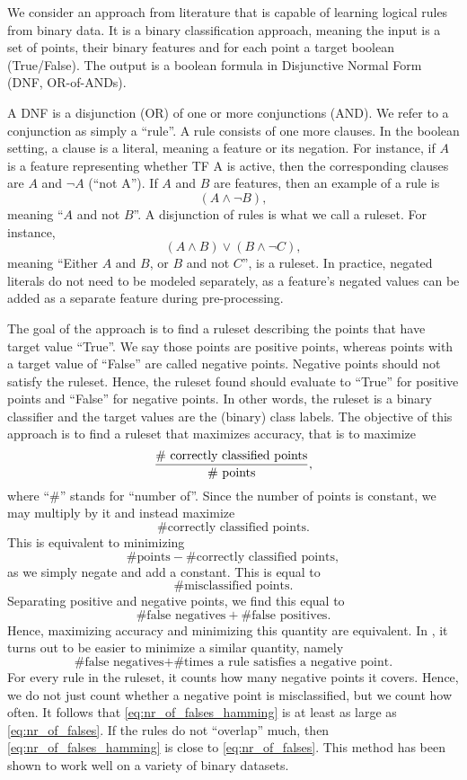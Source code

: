We consider an approach from literature that is capable of learning logical rules from binary data.
It is a binary classification approach, meaning the input is a set of points,
their binary features and for each point a target boolean (True/False).
The output is a boolean formula in Disjunctive Normal Form (DNF, OR-of-ANDs).

A DNF is a disjunction (OR) of one or more conjunctions (AND).
We refer to a conjunction as simply a ``rule''.
A rule consists of one more clauses.
In the boolean setting, a clause is a literal, meaning a feature or its negation.
For instance, if $A$ is a feature representing whether TF A is active,
then the corresponding clauses are $A$ and $\neg A$ (``not A'').
If $A$ and $B$ are features, then an example of a rule is
\[(A \wedge \neg B),\]
meaning ``$A$ and not $B$''.
A disjunction of rules is what we call a ruleset.
For instance,
\[(A \wedge B) \vee (B \wedge \neg C),\]
meaning ``Either $A$ and $B$, or $B$ and not $C$'',
is a ruleset.
In practice, negated literals do not need to be modeled separately,
as a feature's negated values can be added as a separate feature during pre-processing.

The goal of the approach is to find a ruleset describing the points that have target value ``True''.
We say those points are positive points, whereas points with a target value of ``False'' are called negative points.
Negative points should not satisfy the ruleset.
Hence, the ruleset found should evaluate to ``True'' for positive points and ``False'' for negative points.
In other words, the ruleset is a binary classifier and the target values are the (binary) class labels.
The objective of this approach is to find a ruleset that maximizes accuracy, that is to maximize
\[\frac{\text{\# correctly classified points}}{\text{\text{\# points}}},\]
where ``\#'' stands for ``number of''.
Since the number of points is constant, we may multiply by it and instead maximize
\[\text{\# correctly classified points}.\]
This is equivalent to minimizing
\[\text{\# points} - \text{\# correctly classified points},\]
as we simply negate and add a constant.
This is equal to
\[\text{\# misclassified points}.\]
Separating positive and negative points, we find this equal to
\begin{equation}\label{eq:nr_of_falses}
    \text{\# false negatives} + \text{\# false positives}.
\end{equation}
Hence, maximizing accuracy and minimizing this quantity are equivalent.
In \cite{lawless_interpretable_2023}, it turns out to be easier to minimize a similar quantity, namely
\begin{equation}\label{eq:nr_of_falses_hamming}
\text{\# false negatives} + \text{\# times a rule satisfies a negative point.}
\end{equation}
For every rule in the ruleset, it counts how many negative points it covers.
Hence, we do not just count whether a negative point is misclassified, but we count how often.
It follows that \eqref{eq:nr_of_falses_hamming} is at least as large as \eqref{eq:nr_of_falses}.
If the rules do not ``overlap'' much, then \eqref{eq:nr_of_falses_hamming} is close to \eqref{eq:nr_of_falses}.
This method has been shown to work well on a variety of binary datasets.

